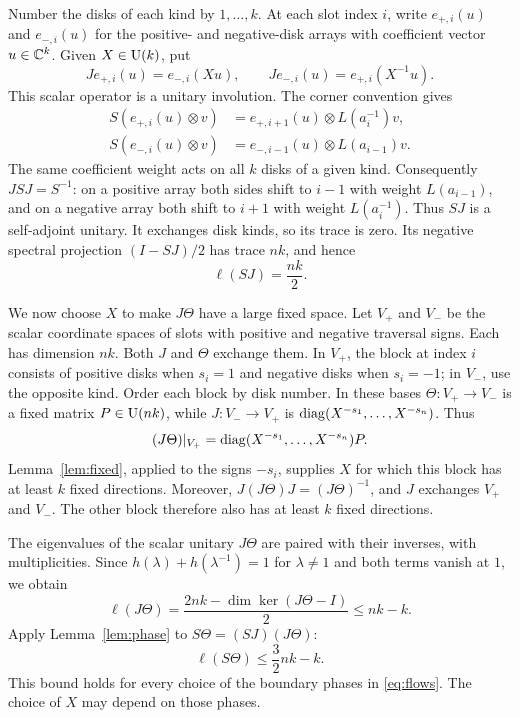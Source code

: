 Number the disks of each kind by $1,\ldots,k$. At each slot index $i$,
write $e_{+,i}(u)$ and $e_{-,i}(u)$ for the positive- and negative-disk
arrays with coefficient vector $u\in\mathbb C^k$. Given $X\in\operatorname{U}(k)$, put
\begin{equation}\label{eq:mixing}
 J e_{+,i}(u)=e_{-,i}(Xu),\qquad
 J e_{-,i}(u)=e_{+,i}(X^{-1}u).
\end{equation}
This scalar operator is a unitary involution. The corner convention gives
\begin{align*}
 S(e_{+,i}(u)\otimes v)&=e_{+,i+1}(u)\otimes L(a_i^{-1})v,\\
 S(e_{-,i}(u)\otimes v)&=e_{-,i-1}(u)\otimes L(a_{i-1})v.
\end{align*}
The same coefficient weight acts on all $k$ disks of a given kind.
Consequently $JSJ=S^{-1}$: on a positive array both sides shift to $i-1$
with weight $L(a_{i-1})$, and on a negative array both shift to $i+1$
with weight $L(a_i^{-1})$. Thus $SJ$ is a self-adjoint unitary. It exchanges
disk kinds, so its trace is zero. Its negative spectral projection
$(I-SJ)/2$ has trace $nk$, and hence
\begin{equation}\label{eq:phaseSJ}
 \ell(SJ)=\frac{nk}{2}.
\end{equation}

We now choose $X$ to make $J\Theta$ have a large fixed space. Let
$V_+$ and $V_-$ be the scalar coordinate spaces of slots with positive
and negative traversal signs. Each has dimension $nk$. Both $J$ and
$\Theta$ exchange them. In $V_+$, the block at index $i$ consists of
positive disks when $s_i=1$ and negative disks when $s_i=-1$; in $V_-$,
use the opposite kind. Order each block by disk number. In these bases
$\Theta:V_+\to V_-$ is a fixed matrix $P\in\operatorname{U}(nk)$, while $J:V_-\to V_+$
is $\operatorname{diag}(X^{-s_1},\ldots,X^{-s_n})$. Thus
\begin{equation}\label{eq:traversalblock}
 (J\Theta)|_{V_+}=\operatorname{diag}(X^{-s_1},\ldots,X^{-s_n})P.
\end{equation}
Lemma~\ref{lem:fixed}, applied to the signs $-s_i$, supplies $X$ for which
this block has at least $k$ fixed directions. Moreover,
$J(J\Theta)J=(J\Theta)^{-1}$, and $J$ exchanges $V_+$ and $V_-$.
The other block therefore also has at least $k$ fixed directions.

The eigenvalues of the scalar unitary $J\Theta$ are paired with their
inverses, with multiplicities. Since
$h(\lambda)+h(\lambda^{-1})=1$ for $\lambda\ne1$ and both terms vanish
at $1$, we obtain
\begin{equation}\label{eq:phaseJTheta}
 \ell(J\Theta)=\frac{2nk-\dim\ker(J\Theta-I)}{2}\leq nk-k.
\end{equation}
Apply Lemma~\ref{lem:phase} to $S\Theta=(SJ)(J\Theta)$:
\begin{equation}\label{eq:upper}
 \ell(S\Theta)\leq\frac32 nk-k.
\end{equation}
This bound holds for every choice of the boundary phases in
\eqref{eq:flows}. The choice of $X$ may depend on those phases.

